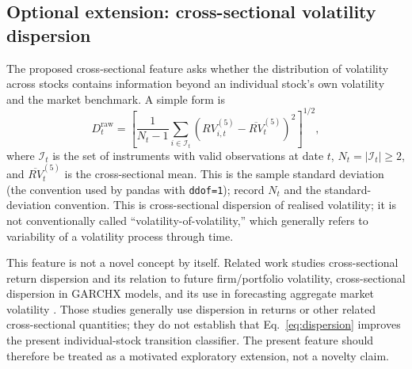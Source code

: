 \documentclass[11pt,a4paper]{article}
\begin{document}
\subsection{Optional extension: cross-sectional volatility dispersion}
\label{sec:dispersion}

The proposed cross-sectional feature asks whether the distribution of volatility across stocks contains information beyond an individual stock's own volatility and the market benchmark. A simple form is
\begin{equation}
  D_t^{\mathrm{raw}}=\left[\frac{1}{N_t-1}\sum_{i\in\mathcal{I}_t}
  \left(RV_{i,t}^{(5)}-\overline{RV}_t^{(5)}\right)^2\right]^{1/2},
  \label{eq:dispersion}
\end{equation}
where $\mathcal{I}_t$ is the set of instruments with valid observations at date $t$, $N_t=|\mathcal{I}_t|\geq2$, and $\overline{RV}_t^{(5)}$ is the cross-sectional mean. This is the sample standard deviation (the convention used by pandas with \texttt{ddof=1}); record $N_t$ and the standard-deviation convention. This is cross-sectional dispersion of realised volatility; it is not conventionally called ``volatility-of-volatility,'' which generally refers to variability of a volatility process through time.

This feature is not a novel concept by itself. Related work studies cross-sectional return dispersion and its relation to future firm/portfolio volatility, cross-sectional dispersion in GARCHX models, and its use in forecasting aggregate market volatility \cite{ConnollyStivers2006,HwangSatchell2005,Byun2016}. Those studies generally use dispersion in returns or other related cross-sectional quantities; they do not establish that Eq.~\eqref{eq:dispersion} improves the present individual-stock transition classifier. The present feature should therefore be treated as a motivated exploratory extension, not a novelty claim.
\end{document}
